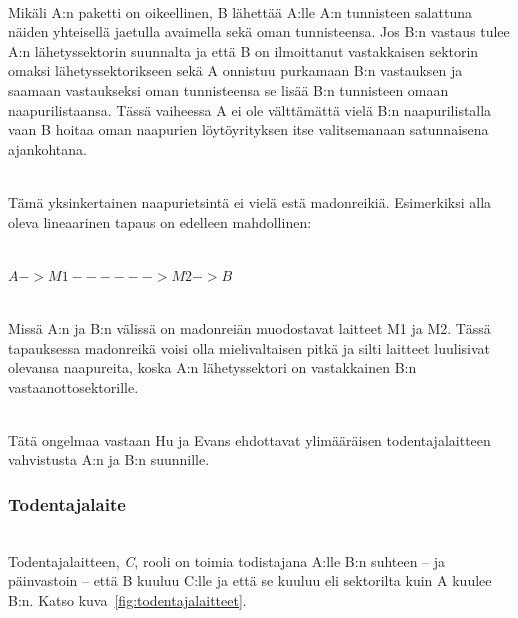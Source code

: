 \documentclass[finnish]{tktltiki2}
\theoremstyle{definition}
\theoremstyle{remark}
\begin{document}
\noindent\\
Mikäli A:n paketti on oikeellinen, B lähettää A:lle A:n tunnisteen salattuna näiden yhteisellä jaetulla avaimella sekä oman tunnisteensa. Jos B:n vastaus tulee A:n lähetyssektorin suunnalta ja että B on ilmoittanut vastakkaisen sektorin omaksi lähetyssektorikseen sekä A onnistuu purkamaan B:n vastauksen ja saamaan vastaukseksi oman tunnisteensa se lisää B:n tunnisteen omaan naapurilistaansa. Tässä vaiheessa A ei ole välttämättä vielä B:n naapurilistalla vaan B hoitaa oman naapurien löytöyrityksen itse valitsemanaan satunnaisena ajankohtana.

\noindent\\
Tämä yksinkertainen naapurietsintä ei vielä estä madonreikiä. Esimerkiksi alla oleva lineaarinen tapaus on edelleen mahdollinen:

\noindent\\
$A -> M1 ------> M2 -> B$

\noindent\\
Missä A:n ja B:n välissä on madonreiän muodostavat laitteet M1 ja M2. Tässä tapauksessa madonreikä voisi olla mielivaltaisen pitkä ja silti laitteet luulisivat olevansa naapureita, koska A:n lähetyssektori on vastakkainen B:n vastaanottosektorille. 

\noindent\\
Tätä ongelmaa vastaan Hu ja Evans ehdottavat ylimääräisen todentajalaitteen vahvistusta A:n ja B:n suunnille.

\subsubsection{Todentajalaite}
\noindent\\
Todentajalaitteen, \emph{C}, rooli on toimia todistajana A:lle B:n suhteen -- ja päinvastoin -- että B kuuluu C:lle ja että se kuuluu eli sektorilta kuin A kuulee B:n. Katso kuva~\ref{fig:todentajalaitteet}.
\end{document}

